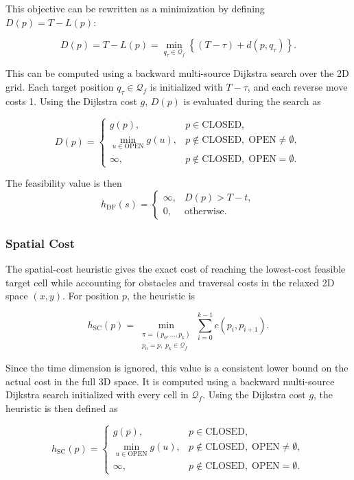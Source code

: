 \documentclass[11pt]{article}
\begin{document}
This objective can be rewritten as a minimization by defining \(D(p)=T-L(p)\):

\[
  D(p)=T-L(p)
  =\min_{q_\tau\in\mathcal{Q}_f}
  \left\{(T-\tau)+d(p,q_\tau)\right\}.
\]

This can be computed using a backward multi-source Dijkstra search over the 2D grid. Each target position \(q_\tau\in\mathcal{Q}_f\) is initialized with \(T-\tau\), and each reverse move costs 1. Using the Dijkstra cost \(g\), \(D(p)\) is evaluated during the search as

\[
  D(p)=
  \begin{cases}
    g(p),   & p\in\mathrm{CLOSED},                                 \\
    \displaystyle\min_{u\in\mathrm{OPEN}}g(u),
            & p\notin\mathrm{CLOSED},\;\mathrm{OPEN}\neq\emptyset, \\
    \infty, & p\notin\mathrm{CLOSED},\;\mathrm{OPEN}=\emptyset.
  \end{cases}
\]

The feasibility value is then
\[
  h_{\mathrm{DF}}(s)=
  \begin{cases}
    \infty, & D(p)>T-t,         \\
    0,      & \text{otherwise}.
  \end{cases}
\]

\subsubsection{Spatial Cost}
The spatial-cost heuristic gives the exact cost of reaching the lowest-cost feasible target cell while accounting for obstacles and traversal costs in the relaxed 2D space \((x,y)\). For position \(p\), the heuristic is

\[
  h_{\mathrm{SC}}(p)
  =
  \min_{\substack{\pi=(p_0,\ldots,p_k)\\p_0=p,\;p_k\in\mathcal{Q}_f}}
  \sum_{i=0}^{k-1} c(p_i,p_{i+1}).
\]

Since the time dimension is ignored, this value is a consistent lower bound on the actual cost in the full 3D space. It is computed using a backward multi-source Dijkstra search initialized with every cell in \(\mathcal{Q}_f\). Using the Dijkstra cost \(g\), the heuristic is then defined as

\[
  h_{\mathrm{SC}}(p)=
  \begin{cases}
    g(p),   & p\in\mathrm{CLOSED},                                 \\
    \displaystyle\min_{u\in\mathrm{OPEN}}g(u),
            & p\notin\mathrm{CLOSED},\;\mathrm{OPEN}\neq\emptyset, \\
    \infty, & p\notin\mathrm{CLOSED},\;\mathrm{OPEN}=\emptyset.
  \end{cases}
\]
\end{document}
